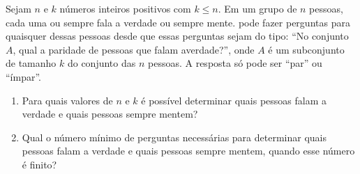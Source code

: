 Sejam $n$ e $k$ números inteiros positivos com $k \leq n$. Em um grupo de $n$ pessoas, cada uma ou sempre fala  a  verdade  ou  sempre  mente.     pode  fazer  perguntas  para  quaisquer  dessas  pessoas desde que essas perguntas sejam do tipo:  “No conjunto $A$, qual a paridade de pessoas que falam averdade?”, onde $A$ é um subconjunto de tamanho $k$ do conjunto das $n$ pessoas. A resposta só pode ser ``par'' ou ``ímpar''.
\begin{enumerate}[label = (\alph*)]
	\item Para quais valores de $n$ e $k$ é possível determinar quais pessoas falam a verdade e quais pessoas sempre mentem?
	\item Qual o número mínimo de perguntas necessárias para determinar quais pessoas falam a verdade e quais pessoas sempre mentem, quando esse número é finito?
\end{enumerate}
